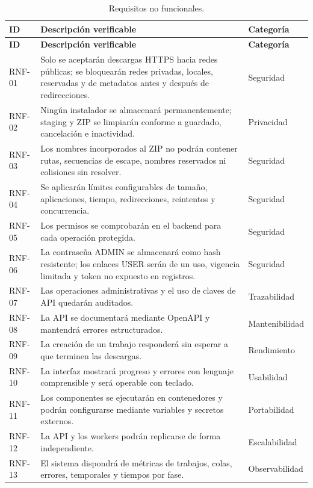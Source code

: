 {\small
\begin{longtable}{p{}p{}p{}}
\caption{Requisitos no funcionales.}\label{tabla:requisitos-no-funcionales}\\
\toprule
\textbf{ID} & \textbf{Descripción verificable} & \textbf{Categoría}\\
\midrule
\endfirsthead
\toprule
\textbf{ID} & \textbf{Descripción verificable} & \textbf{Categoría}\\
\midrule
\endhead
RNF-01 & Solo se aceptarán descargas HTTPS hacia redes públicas; se bloquearán redes privadas, locales, reservadas y de metadatos antes y después de redirecciones. & Seguridad\\
RNF-02 & Ningún instalador se almacenará permanentemente; staging y ZIP se limpiarán conforme a guardado, cancelación e inactividad. & Privacidad\\
RNF-03 & Los nombres incorporados al ZIP no podrán contener rutas, secuencias de escape, nombres reservados ni colisiones sin resolver. & Seguridad\\
RNF-04 & Se aplicarán límites configurables de tamaño, aplicaciones, tiempo, redirecciones, reintentos y concurrencia. & Seguridad\\
RNF-05 & Los permisos se comprobarán en el backend para cada operación protegida. & Seguridad\\
RNF-06 & La contraseña ADMIN se almacenará como hash resistente; los enlaces USER serán de un uso, vigencia limitada y token no expuesto en registros. & Seguridad\\
RNF-07 & Las operaciones administrativas y el uso de claves de API quedarán auditados. & Trazabilidad\\
RNF-08 & La API se documentará mediante OpenAPI y mantendrá errores estructurados. & Mantenibilidad\\
RNF-09 & La creación de un trabajo responderá sin esperar a que terminen las descargas. & Rendimiento\\
RNF-10 & La interfaz mostrará progreso y errores con lenguaje comprensible y será operable con teclado. & Usabilidad\\
RNF-11 & Los componentes se ejecutarán en contenedores y podrán configurarse mediante variables y secretos externos. & Portabilidad\\
RNF-12 & La API y los workers podrán replicarse de forma independiente. & Escalabilidad\\
RNF-13 & El sistema dispondrá de métricas de trabajos, colas, errores, temporales y tiempos por fase. & Observabilidad\\

\end{longtable}}
